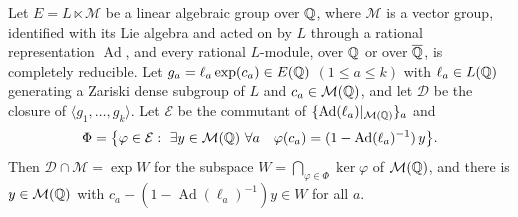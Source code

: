 \begin{lemma}\label{lem:abext}
Let $E=L\ltimes\mathcal M$ be a linear algebraic group over $\mathbb{Q}$, where $\mathcal M$ is a vector
group, identified with its Lie algebra and acted on by $L$ through a rational representation
$\operatorname{Ad}$, and every rational $L$-module, over $\mathbb{Q}$ or over $\overline{\mathbb{Q}}$, is completely reducible. Let
$g_a=\ell_a\exp(c_a)\in E(\mathbb{Q})$ $(1\le a\le k)$ with $\ell_a\in L(\mathbb{Q})$ generating a Zariski dense
subgroup of $L$ and $c_a\in\mathcal M(\mathbb{Q})$, and let $\mathcal D$ be the closure of
$\langle g_1,\ldots,g_k\rangle$. Let $\mathcal E$ be the commutant of
$\{\operatorname{Ad}(\ell_a)|_{\mathcal M(\mathbb{Q})}\}_a$ and
\[
\Phi=\bigl\{\varphi\in\mathcal E:\ \exists y\in\mathcal M(\mathbb{Q})\ \forall a\quad
\varphi(c_a)=(1-\operatorname{Ad}(\ell_a)^{-1})\,y\bigr\}.
\]
Then $\mathcal D\cap\mathcal M=\exp W$ for the subspace $W=\bigcap_{\varphi\in\Phi}\ker\varphi$ of
$\mathcal M(\mathbb{Q})$, and there is $y\in\mathcal M(\mathbb{Q})$ with
$c_a-(1-\operatorname{Ad}(\ell_a)^{-1})y\in W$ for all $a$.
\end{lemma}
